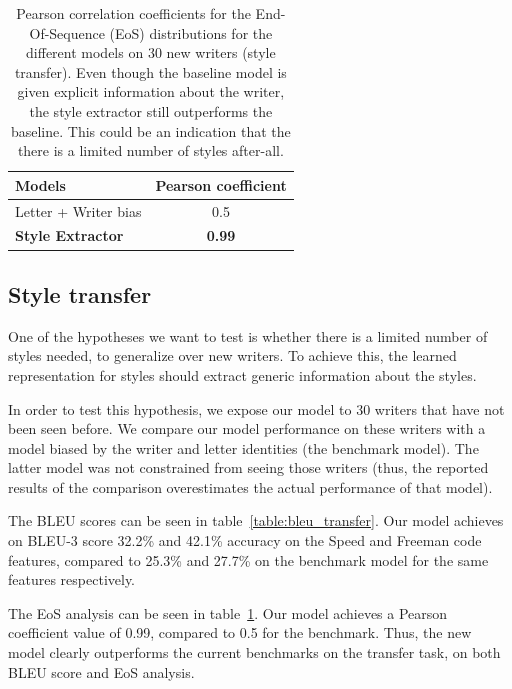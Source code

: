   \begin{table}[!htbp]
  \centering
  \begin{tabular}{l|c}
  \hline
  Models & Pearson coefficient\\ \hline
  Letter + Writer bias & 0.5\\ \hline
  \textbf{Style Extractor} & \textbf{0.99}\\ \hline
  \end{tabular}
  \caption{Pearson correlation coefficients for the End-Of-Sequence (EoS) distributions for the different models on 30 new writers (style transfer). Even though the baseline model is given explicit information about the writer, the style extractor still outperforms the baseline. This could be an indication that the there is a limited number of styles after-all.}
  \label{table:EoS_transfer}
  \end{table}

  \subsection{Style transfer}
  \par One of the hypotheses we want to test is whether there is a limited number of styles needed, to generalize over new writers. To achieve this, the learned representation for styles should extract generic information about the styles.

  \par In order to test this hypothesis, we expose our model to 30 writers that have not been seen before. We compare our model performance on these writers with a model biased by the writer and letter identities (the benchmark model). The latter model was not constrained from seeing those writers (thus, the reported results of the comparison overestimates the actual performance of that model).

  \par The BLEU scores can be seen in table~\ref{table:bleu_transfer}. Our model achieves on BLEU-3 score 32.2\% and 42.1\% accuracy on the Speed and Freeman code features, compared to 25.3\% and 27.7\% on the benchmark model for the same features respectively.
  \par The EoS analysis can be seen in table~\ref{table:EoS_transfer}. Our model achieves a Pearson coefficient value of 0.99, compared to 0.5 for the benchmark.
  Thus, the new model clearly outperforms the current benchmarks on the transfer task, on both BLEU score and EoS analysis.

